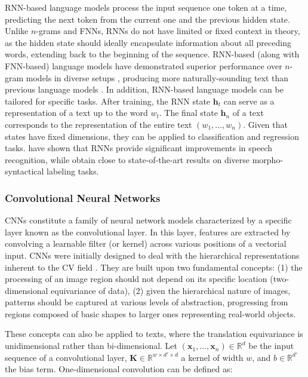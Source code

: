 \ac{RNN}-based language models process the input sequence one token at a time, predicting the next token from the current one and the previous hidden state. Unlike $n$-grams and \acp{FNN}, \acp{RNN} do not have limited or fixed context in theory, as the hidden state should ideally encapsulate information about all preceding words, extending back to the beginning of the sequence.
\ac{RNN}-based (along with \ac{FNN}-based) language models have demonstrated superior performance over $n$-gram models in diverse setups \citep{mikolov2010recurrent}, producing more naturally-sounding text than previous language models \citep{kovavcevic2022bidirectional}. In addition, \ac{RNN}-based language models can be tailored for specific tasks. After training, the \ac{RNN} state $\bm{h}_t$ can serve as a representation of a text up to the word $w_t$. The final state $\bm{h}_{n}$ of a text corresponds to the representation of the entire text $(w_1, \ldots, w_n)$. Given that states have fixed dimensions, they can be applied to classification and regression tasks. \citet{schwenk2007continuous} have shown that \acp{RNN} provide significant improvements in speech recognition, while \citet{collobert2011deep} obtain close to state-of-the-art results on diverse morpho-syntactical labeling tasks.

\subsubsection{Convolutional Neural Networks}

\acp{CNN} constitute a family of neural network models characterized by a specific layer known as the convolutional layer. In this layer, features are extracted by convolving a learnable filter (or kernel) across various positions of a vectorial input.
\acp{CNN} were initially designed to deal with the hierarchical representations inherent to the \ac{CV} field \citep{lecun1989backpropagation}. They are built upon two fundamental concepts: (1) the processing of an image region should not depend on its specific location (two-dimensional equivariance of data), (2) given the hierarchical nature of images, patterns should be captured at various levels of abstraction, progressing from regions composed of basic shapes to larger ones representing real-world objects. 

These concepts can also be applied to texts, where the translation equivariance is unidimensional rather than bi-dimensional. Let $(\bm{x}_1, \ldots, \bm{x}_n) \in \mathbb{R}^d$ be the input sequence of a convolutional layer, $\bm{K} \in \mathbb{R}^{w \times d' \times d}$ a kernel of width $w$, and $b \in \mathbb{R}^{d'}$ the bias term. One-dimensional convolution can be defined as:

